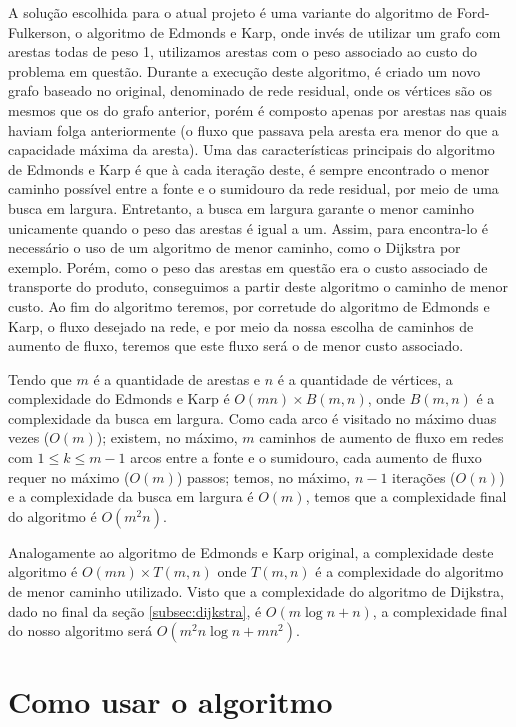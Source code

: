 \documentclass[12pt,a4]{article}
\begin{document}
A solução escolhida para o atual projeto é uma variante do algoritmo de
Ford-Fulkerson, o algoritmo de Edmonds e Karp, onde invés de utilizar um grafo
com arestas todas de peso 1, utilizamos arestas com o peso associado ao custo do
problema em questão. Durante a execução deste algoritmo, é criado um novo grafo
baseado no original, denominado de rede residual, onde os vértices são os mesmos
que os do grafo anterior, porém é composto apenas por arestas nas quais haviam
folga anteriormente (o fluxo que passava pela aresta era menor do que a
capacidade máxima da aresta). Uma das características principais do algoritmo de
Edmonds e Karp é que à cada iteração deste, é sempre encontrado o menor caminho
possível entre a fonte e o sumidouro da rede residual, por meio de uma busca em
largura. Entretanto, a busca em largura garante o menor caminho unicamente
quando o peso das arestas é igual a um. Assim, para encontra-lo é necessário o
uso de um algoritmo de menor caminho, como o Dijkstra por exemplo. Porém, como o
peso das arestas em questão era o custo associado de transporte do produto,
conseguimos a partir deste algoritmo o caminho de menor custo. Ao fim do
algoritmo teremos, por corretude do algoritmo de Edmonds e Karp, o fluxo
desejado na rede, e por meio da nossa escolha de caminhos de aumento de fluxo,
teremos que este fluxo será o de menor custo associado.

Tendo que $m$ é a quantidade de arestas e $n$ é a quantidade de vértices, a
complexidade do Edmonds e Karp é $O(mn) \times B(m,n)$, onde $B(m,n)$ é a
complexidade da busca em largura. Como cada arco é visitado no máximo duas vezes
($O(m)$); existem, no máximo, $m$ caminhos de aumento de fluxo em redes com
$1 \leq k \leq m-1$ arcos entre a fonte e o sumidouro, cada aumento de fluxo
requer no máximo ($O(m)$) passos; temos, no máximo, $n-1$ iterações ($O(n)$) e a
complexidade da busca em largura é $O(m)$, temos que a complexidade final do
algoritmo é $O(m^2 n)$.

Analogamente ao algoritmo de Edmonds e Karp original, a complexidade deste
algoritmo é $O(mn) \times T(m,n)$ onde $T(m,n)$ é a complexidade do algoritmo de
menor caminho utilizado. Visto que a complexidade do algoritmo de Dijkstra, dado
no final da seção \ref{subsec:dijkstra}, é $O(m \log n + n)$, a complexidade
final do nosso algoritmo será $O(m^2 n \log n + m n^2)$.

\section{Como usar o algoritmo}
\label{sec:usage}
\end{document}
